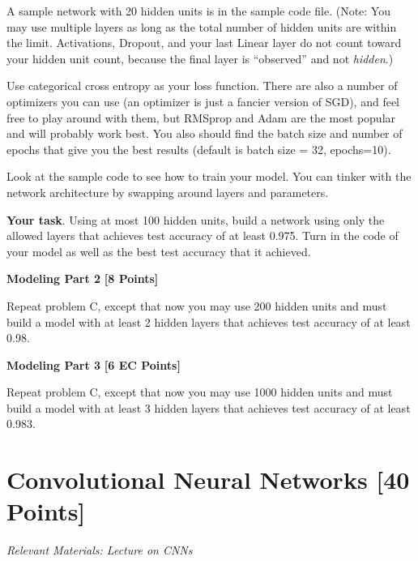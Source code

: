 A sample network with 20 hidden units is in the sample code file. (Note: You may use multiple layers as long as the total number of hidden units are within the limit. Activations, Dropout, and your last Linear layer do not count toward your hidden unit count, because the final layer is ``observed'' and not \emph{hidden}.)

Use categorical cross entropy as your loss function. There are also a number of optimizers  you can use (an optimizer is just a fancier version of SGD), and feel free to play around with them, but RMSprop and Adam are the most popular and will probably work best. You also should find the batch size and number of epochs that give you the best results (default is batch size = 32, epochs=10).

Look at the sample code to see how to train your model. You can tinker with the network architecture by swapping around layers and parameters.

\textbf{Your task}. Using at most 100 hidden units, build a network using only the allowed layers that achieves test accuracy of at least 0.975. Turn in the code of your model as well as the best test accuracy that it achieved.



\begin{solution}

\end{solution}


 \problem \textbf{Modeling Part 2} \textbf{[8 Points]}

 Repeat problem C, except that now you may use 200 hidden units and must build a model with at least 2 hidden layers that achieves test accuracy of at least 0.98.

\begin{solution}
 
\end{solution}

 \problem \textbf{Modeling Part 3} \textbf{[6 EC Points]}

 Repeat problem C, except that now you may use 1000 hidden units and must build a model with at least 3 hidden layers that achieves test accuracy of at least 0.983.

\begin{solution}

\end{solution}

 \newpage
 \section{Convolutional Neural Networks  [40 Points]}
 \textit{Relevant Materials: Lecture on CNNs}

